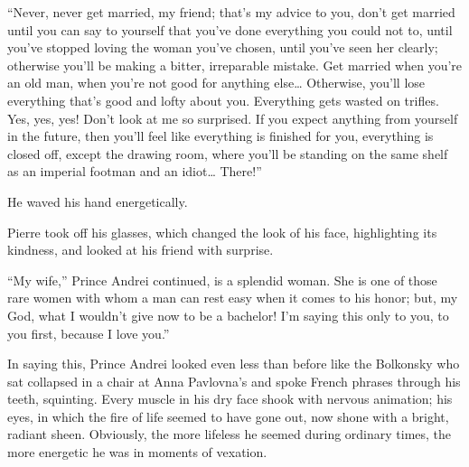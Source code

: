 ``Never, never get married, my friend; that's my advice to you, don't get married until you can say to yourself that you've done everything you could not to, until you've stopped loving the woman you've chosen, until you've seen her clearly; otherwise you'll be making a bitter, irreparable mistake. Get married when you're an old man, when you're not good for anything else\ldots{} Otherwise, you'll lose everything that's good and lofty about you. Everything gets wasted on trifles. Yes, yes, yes! Don't look at me so surprised. If you expect anything from yourself in the future, then you'll feel like everything is finished for you, everything is closed off, except the drawing room, where you'll be standing on the same shelf as an imperial footman and an idiot\ldots{} There!'' %

He waved his hand energetically.

Pierre took off his glasses, which changed the look of his face, highlighting its kindness, and looked at his friend with surprise.

``My wife,'' Prince Andrei continued, is a splendid woman. She is one of those rare women with whom a man can rest easy when it comes to his honor; but, my God, what I wouldn't give now to be a bachelor! I'm saying this only to you, to you first, because I love you.'' %

In saying this, Prince Andrei looked even less than before like the Bolkonsky who sat collapsed in a chair at Anna Pavlovna's and spoke French phrases through his teeth, squinting. Every muscle in his dry face shook with nervous animation; his eyes, in which the fire of life seemed to have gone out, now shone with a bright, radiant sheen. Obviously, the more lifeless he seemed during ordinary times, the more energetic he was in moments of vexation.

